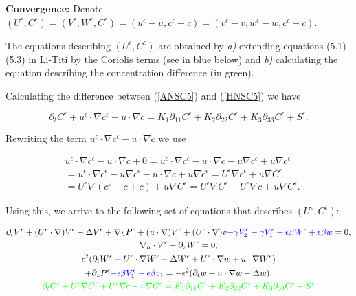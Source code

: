 \documentclass[11pt]{article}
\begin{document}
\textbf{Convergence:}  
Denote $(U^\epsilon, C^\epsilon) = (V^\epsilon, W^\epsilon, C^\epsilon) = (u^\epsilon - u, c^\epsilon - c) = (v^\epsilon - v, w^\epsilon - w, c^\epsilon - c).$

The equations describing $(U^\epsilon, C^\epsilon)$ are obtained by \textit{a)} extending equations (5.1)-(5.3) in Li-Titi by the Coriolis terms (see in blue below) and \textit{b)} calculating the equation describing the concentration difference (in green).

Calculating the difference between (\ref{ANSC5}) and (\ref{HNSC5}) we have

$$ \partial_t C^\epsilon + u^\epsilon \cdot \nabla c^\epsilon - u \cdot \nabla c = K_1 \partial_{11} C^\epsilon + K_2 \partial_{22} C^\epsilon + K_3 \partial_{33} C^\epsilon + S^\epsilon.$$

Rewriting the term $u^\epsilon \cdot \nabla c^\epsilon - u \cdot \nabla c$ we use

\begin{equation}
  \begin{split}
    & u^\epsilon \cdot \nabla c^\epsilon - u \cdot \nabla c + 0 = u^\epsilon \cdot \nabla c^\epsilon - u \cdot \nabla c - u \nabla c^\epsilon + u \nabla c^\epsilon \\
    & = u^\epsilon \cdot \nabla c^\epsilon - u \nabla c^\epsilon - u \cdot \nabla c + u \nabla c^\epsilon = U^\epsilon \nabla c^\epsilon + u \nabla C^\epsilon \\
    & = U^\epsilon \nabla (c^\epsilon - c + c) + u \nabla C^\epsilon = U^\epsilon \nabla C^\epsilon  + U^\epsilon \nabla c+ u \nabla C^\epsilon.
  \end{split}
\end{equation}

Using this, we arrive to the following set of equations that describes $(U^\epsilon, C^\epsilon)$:

\begin{equation} \label{U_eps_C_eps}
  \begin{gathered}
    \partial_t V^\epsilon + (U^\epsilon \cdot \nabla) V^\epsilon - \Delta V^\epsilon + \nabla_h P^\epsilon + (u \cdot \nabla) V^\epsilon + (U^\epsilon \cdot \nabla) v \textcolor{blue}{- \gamma V_2^\epsilon + \gamma V_1^\epsilon + \epsilon \beta W^\epsilon  + \epsilon \beta w} = 0, \\
    \nabla_h \cdot V^\epsilon + \partial_z W^\epsilon = 0, \\
    \epsilon^2 (\partial_t W^\epsilon + U^\epsilon \cdot \nabla W^\epsilon - \Delta W^\epsilon + U^\epsilon \cdot \nabla w + u \cdot \nabla W^\epsilon) \\
    + \partial_z P^\epsilon \textcolor{blue}{- \epsilon \beta V_1^\epsilon - \epsilon \beta v_1} = - \epsilon^2 (\partial_t w + u \cdot \nabla w - \Delta w), \\
     \textcolor{green}{\partial_t C^\epsilon + U^\epsilon \nabla C^\epsilon  + U^\epsilon \nabla c+ u \nabla C^\epsilon = K_1 \partial_{11} C^\epsilon + K_2 \partial_{22} C^\epsilon + K_3 \partial_{33} C^\epsilon + S^\epsilon}
  \end{gathered}
\end{equation}
\end{document}
